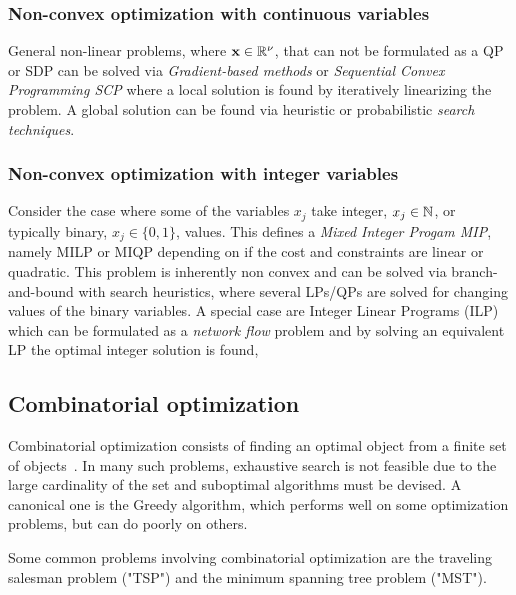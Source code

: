 \subsubsection{Non-convex optimization with continuous variables}
General non-linear problems, where $\textbf{x}\in\mathbb{R}^\nu$, that can not be formulated as a QP or SDP can be solved via \emph{Gradient-based methods} or \emph{Sequential Convex Programming SCP} where a local solution is found by iteratively linearizing the problem. A global solution can be found via heuristic or probabilistic \emph{search techniques}.  

\subsubsection{Non-convex optimization with integer variables}
Consider the case where some of the variables $x_j$ take integer, $x_j \in \mathbb{N}$, or typically binary, $x_j \in \{0,1\}$, values.
This defines a \emph{Mixed Integer Progam MIP}, namely MILP or MIQP depending on if the cost and constraints are linear or quadratic. This problem is inherently non convex and can be solved via branch-and-bound with search heuristics, where several LPs/QPs are solved for changing values of the binary variables. A special case are Integer Linear Programs (ILP) which can be formulated as a \emph{network flow} problem and by solving an equivalent LP the optimal integer solution is found,

\subsection{Combinatorial optimization}

Combinatorial optimization consists of finding an optimal object from a finite set of objects~\cite{Ahuja:1993tk}. In many such problems, exhaustive search is not feasible due to the large cardinality of the set and suboptimal algorithms must be devised. 
A canonical one is the Greedy algorithm, which performs well on some optimization problems, but can do poorly on others.

Some common problems involving combinatorial optimization are the traveling salesman problem ("TSP") and the minimum spanning tree problem ("MST").

